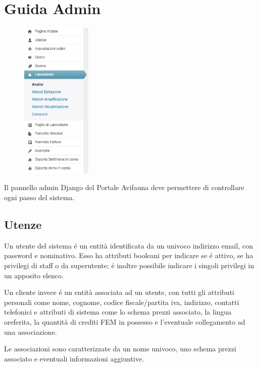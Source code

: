 \chapter{Guida Admin}
\label{app:admin}

\begin{figure}
  \begin{center}
    \includegraphics[width=0.3\textwidth]{images/suit}
  \end{center}
\end{figure}

Il pannello admin Django del Portale Avifauna deve permettere di controllare ogni passo del sistema.

\section*{Utenze}
Un utente del sistema é un entità identificata da un univoco indirizzo email, con password e nominativo. Esso ha attributi booleani per indicare se é attivo, se ha privilegi di staff o da superutente; é inoltre possibile indicare i singoli privilegi in un apposito elenco.

Un cliente invece é un entità associata ad un utente, con tutti gli attributi personali come nome, cognome, codice fiscale/partita iva, indirizzo, contatti telefonici e attributi di sistema come lo schema prezzi associato, la lingua oreferita, la quantità di crediti FEM in possesso e l'eventuale collegamento ad una associazione.

Le associazioni sono caratterizzate da un nome univoco, uno schema prezzi associato e eventuali informazioni aggiuntive.

